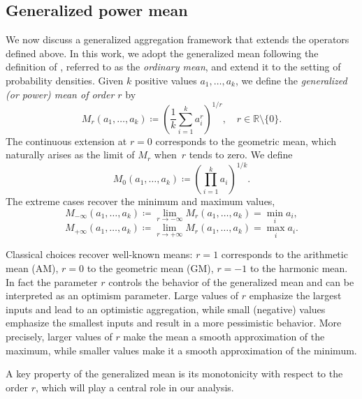 \documentclass[accepted]{uai2026} %
\begin{document}
\subsection{Generalized power mean} \label{section: generalized power mean}

We now discuss a generalized aggregation framework that extends the operators defined above. In this work, we adopt the generalized mean following the definition of \cite{hardy1952inequalities}, referred to as the \emph{ordinary mean}, and extend it to the setting of probability densities. Given $k$ positive values $a_1,\dots,a_k$, we define the \emph{generalized (or power) mean of order $r$} by
\begin{equation}
M_{r}(a_1,\dots,a_k) \coloneqq \left( \frac{1}{k} \sum_{i=1}^k a_i^r \right)^{1/r},
\quad r \in \mathbb{R} \setminus \{0\}.
\end{equation}
The continuous extension at $r = 0$ corresponds to the geometric mean, which naturally arises as the limit of $M_{r}$ when~$r$ tends to zero. We define
\begin{equation}
M_{0}(a_1,\dots,a_k) \coloneqq \left( \prod_{i=1}^k a_i \right)^{1/k}.
\end{equation}
The extreme cases recover the minimum and maximum values,
\begin{equation*}
M_{-\infty}(a_1,\dots,a_k) \coloneqq \lim_{r \to -\infty} M_{r}(a_1,\dots,a_k) = \min_i a_i,
\end{equation*}
\begin{equation*}\label{eq: Mr infty}
M_{+\infty}(a_1,\dots,a_k) \coloneqq \lim_{r \to +\infty} M_{r}(a_1,\dots,a_k) = \max_i a_i.
\end{equation*}


Classical choices recover well-known means: $r=1$ corresponds to the arithmetic mean (AM), $r=0$ to the geometric mean (GM), $r=-1$ to the harmonic mean. In fact the parameter $r$ controls the behavior of the generalized mean and can be interpreted as an optimism parameter. Large values of $r$ emphasize the largest inputs and lead to an optimistic aggregation, while small (negative) values emphasize the smallest inputs and result in a more pessimistic behavior. More precisely, larger values of $r$ make the mean a smooth approximation of the maximum, while smaller values make it a smooth approximation of the minimum. 

A key property of the generalized mean is its monotonicity with respect to the order $r$, which will play a central role in our analysis.
\end{document}
